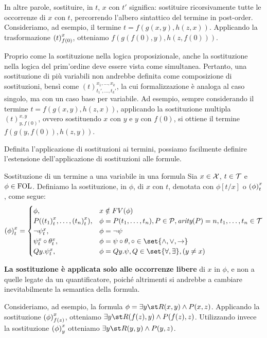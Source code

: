 In altre parole, sostituire, in \(t\), \(x\) con \(t'\) significa: sostituire ricorsivamente tutte le occorrenze di \(x\) con \(t\), percorrendo l'albero sintattico del termine in post-order. 
Consideriamo, ad esempio, il termine \(t = f(g(x,y), h(z,x))\). Applicando la trasformazione \({{\left(t\right)}^{x}_{f(0)}}\), otteniamo \(f(g(f(0),y), h(z,f(0)))\).

Proprio come la sostituzione nella logica proposizionale, anche la sostituzione nella logica del prim'ordine deve essere vista come simultanea.
Pertanto, una sostituzione di più variabili non andrebbe definita come composizione di sostituzioni, bensì come \({(t)}^{x_1,\ldots,x_k}_{t_1',\ldots,t_k'}\), la cui formalizzazione è analoga al caso singolo, ma con un caso base per variabile. 
Ad esempio, sempre considerando il termine \(t = f(g(x,y), h(z,x))\), applicando la sostituzione multipla \({(t)}^{x,y}_{y,f(0)}\), ovvero sostituendo \(x\) con \(y\) e \(y\) con \(f(0)\), si ottiene il termine \(f(g(y,f(0)), h(z,y))\).

Definita l'applicazione di sostituzioni ai termini, possiamo facilmente definire l'estensione dell'applicazione di sostituzioni alle formule.

\begin{definition}{Sostituzione di un termine a una variabile in una formula}
  Sia \(x\in\mathcal{X}\), \(t\in\mathcal{T}\) e \(\phi\in\FOL\). Definiamo la sostituzione, in \(\phi\), di \(x\) con \(t\), denotata con \(\phi[t/x]\) o \({{\left(\phi\right)}^{x}_{t}}\), come segue:
  \[\subs{\phi}{x}{t} = \begin{cases}
    \phi, & x \notin FV(\phi)\\
    P({(t_1)}^x_{t}, \ldots, {(t_n)}^x_{t}), & \phi = P(t_1,\ldots,t_n), P\in\PredSyms, \arty(P)=n, t_1,\ldots,t_n \in \Terms\\
    \neg {\psi}^x_{t}, & \phi = \neg \psi\\
    {\psi}^x_{t}\circ{\theta}^x_{t}, & \phi = \psi\circ\theta, \circ\in\set{\land,\lor,\to}\\
    Q y. {\psi}^x_{t}, & \phi = Q y. \psi, Q\in\set{\forall,\exists}, (y\neq x)
  \end{cases}\]
\end{definition}

\textbf{La sostituzione è applicata solo alle occorrenze libere} di \(x\) in \(\phi\), e non a quelle legate da un quantificatore, poiché altrimenti si andrebbe a cambiare inevitabilmente la semantica della formula.

Consideriamo, ad esempio, la formula \(\phi = \exists y\st R(x,y) \land P(x,z)\). Applicando la sostituzione \({{\left(\phi\right)}^{x}_{f(z)}}\), otteniamo \(\exists y\st R(f(z),y) \land P(f(z),z)\).
Utilizzando invece la sostituzione \({{\left(\phi\right)}^{x}_{y}}\) otteniamo \(\exists y\st R(y,y) \land P(y,z)\).

